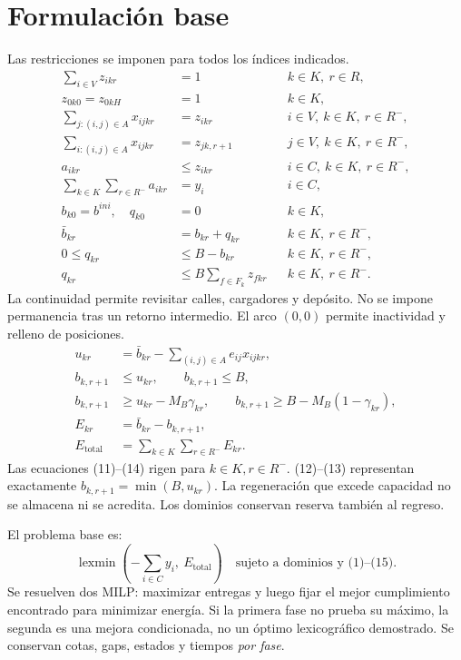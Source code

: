 \documentclass[11pt,a4paper]{article}
\newcommand{\Rminus}{R^{-}}
\begin{document}
\section{Formulación base}
Las restricciones se imponen para todos los índices indicados.
\begin{align}
\sum_{i\in V} z_{ikr}&=1 && k\in K,\ r\in R, \tag{1}\\
z_{0k0}=z_{0kH}&=1 && k\in K, \tag{2}\\
\sum_{j:(i,j)\in A}x_{ijkr}&=z_{ikr} && i\in V,\ k\in K,\ r\in\Rminus, \tag{3}\\
\sum_{i:(i,j)\in A}x_{ijkr}&=z_{jk,r+1} && j\in V,\ k\in K,\ r\in\Rminus, \tag{4}\\
a_{ikr}&\le z_{ikr} && i\in C,\ k\in K,\ r\in\Rminus, \tag{5}\\
\sum_{k\in K}\sum_{r\in\Rminus}a_{ikr}&=y_i && i\in C, \tag{6}\\
b_{k0}=b^{ini},\quad q_{k0}&=0 && k\in K, \tag{7}\\
\bar b_{kr}&=b_{kr}+q_{kr} && k\in K,\ r\in\Rminus, \tag{8}\\
0\le q_{kr}&\le B-b_{kr} && k\in K,\ r\in\Rminus, \tag{9}\\
q_{kr}&\le B\sum_{f\in F_k}z_{fkr} && k\in K,\ r\in\Rminus. \tag{10}
\end{align}
La continuidad permite revisitar calles, cargadores y depósito. No se impone
permanencia tras un retorno intermedio. El arco $(0,0)$ permite inactividad
y relleno de posiciones.
\begin{align}
u_{kr}&=\bar b_{kr}-\sum_{(i,j)\in A}e_{ij}x_{ijkr}, \tag{11}\\
b_{k,r+1}&\le u_{kr},\qquad b_{k,r+1}\le B, \tag{12}\\
b_{k,r+1}&\ge u_{kr}-M_B\gamma_{kr},\qquad
b_{k,r+1}\ge B-M_B(1-\gamma_{kr}), \tag{13}\\
E_{kr}&=\bar b_{kr}-b_{k,r+1}, \tag{14}\\
E_{\mathrm{total}}&=\sum_{k\in K}\sum_{r\in\Rminus}E_{kr}. \tag{15}
\end{align}
Las ecuaciones (11)--(14) rigen para $k\in K,r\in\Rminus$.
(12)--(13) representan exactamente $b_{k,r+1}=\min(B,u_{kr})$.
La regeneración que excede capacidad no se almacena ni se acredita.
Los dominios conservan reserva también al regreso.

El problema base es:
\begin{equation}
\boxed{\operatorname{lexmin}\left(-\sum_{i\in C}y_i,\ E_{\mathrm{total}}\right)
\quad\text{sujeto a dominios y (1)--(15).}} \tag{16}
\end{equation}
Se resuelven dos MILP: maximizar entregas y luego fijar el mejor cumplimiento
encontrado para minimizar energía. Si la primera fase no prueba su máximo,
la segunda es una mejora condicionada, no un óptimo lexicográfico demostrado.
Se conservan cotas, gaps, estados y tiempos \emph{por fase}.
\end{document}
